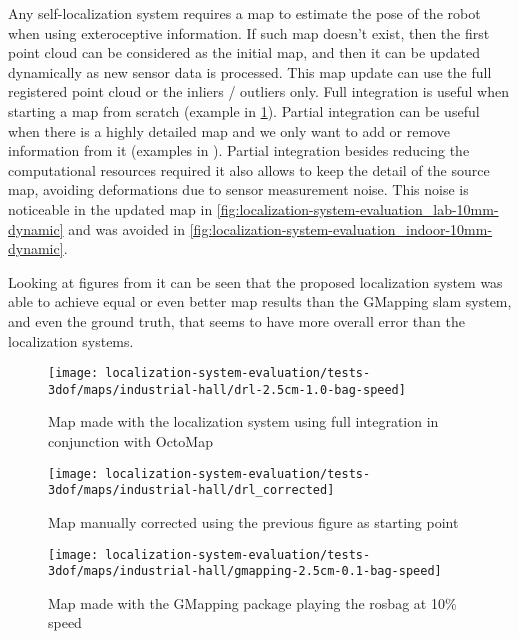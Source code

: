 Any self-localization system requires a map to estimate the pose of the robot when using exteroceptive information. If such map doesn't exist, then the first point cloud can be considered as the initial map, and then it can be updated dynamically as new sensor data is processed. This map update can use the full registered point cloud or the inliers / outliers only. Full integration is useful when starting a map from scratch (example in \cref{fig:localization-system-evaluation_drl-2.5cm-1.0-bag-speed}). Partial integration can be useful when there is a highly detailed map and we only want to add or remove information from it (examples in ). Partial integration besides reducing the computational resources required it also allows to keep the detail of the source map, avoiding deformations due to sensor measurement noise. This noise is noticeable in the updated map in \cref{fig:localization-system-evaluation_lab-10mm-dynamic} and was avoided in \cref{fig:localization-system-evaluation_indoor-10mm-dynamic}.

Looking at figures from  it can be seen that the proposed localization system was able to achieve equal or even better map results than the GMapping \gls{slam} system, and even the ground truth, that seems to have more overall error than the localization systems.


\begin{figure}[H]
	\centering
	\texttt{[image: localization-system-evaluation/tests-3dof/maps/industrial-hall/drl-2.5cm-1.0-bag-speed]}
	\caption{Map made with the localization system using full integration in conjunction with OctoMap}
	\label{fig:localization-system-evaluation_drl-2.5cm-1.0-bag-speed}
\end{figure}

\begin{figure}[H]
	\centering
	\texttt{[image: localization-system-evaluation/tests-3dof/maps/industrial-hall/drl\_corrected]}
	\caption{Map manually corrected using the previous figure as starting point}
	\label{fig:localization-system-evaluation_drl_corrected}
\end{figure}

\begin{figure}[H]
	\centering
	\texttt{[image: localization-system-evaluation/tests-3dof/maps/industrial-hall/gmapping-2.5cm-0.1-bag-speed]}
	\caption{Map made with the GMapping package playing the rosbag at 10\% speed}
	\label{fig:localization-system-evaluation_gmapping-2.5cm-0.1-bag-speed}
\end{figure}

